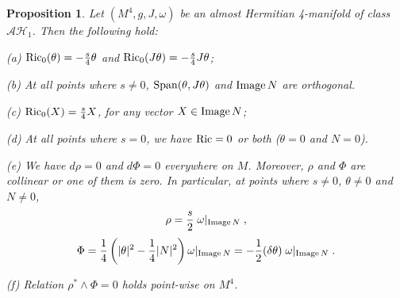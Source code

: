 \documentclass{amsart}
\newtheorem{prop}[theorem]{Proposition}
\begin{document}
\begin{prop} \label{ah1-facts}
Let $(M^4, g, J, \omega)$ be an almost Hermitian 4-manifold of class $\mathcal{AH}_1$. Then the following hold:

\vspace{0.2cm}
(a) ${\rm Ric}_0(\theta) = -\frac{s}{4} \theta$ and ${\rm Ric}_0(J\theta) = -\frac{s}{4} J\theta$;

\vspace{0.2cm}
(b) At all points where $s \neq 0$, ${\rm Span}(\theta, J\theta)$ and ${\rm Image} \, N $ are orthogonal. 

\vspace{0.2cm}

(c) ${\rm Ric}_0(X) = \frac{s}{4} X$, for any vector $ X \in {\rm Image} \, N$;

\vspace{0.2cm}

(d) At all points where $s = 0$, we have ${\rm Ric} = 0$ or both ($\theta = 0$ and $N=0$).

\vspace{0.2cm}

(e) We have $d \rho = 0$ and $d \Phi = 0$ everywhere on $M$. Moreover,  $\rho$ and $\Phi$ are collinear or one of them is zero. In particular, at points where $s\neq 0$, $\theta \neq 0$ and $N\neq 0$, 
$$\rho = \frac{s}{2} \; \omega|_{{\rm Image}\, N}  \; ,$$
$$ \Phi = \frac{1}{4} \left( |\theta|^2 - \frac{1}{4}|N|^2 \right) \omega|_{{\rm Image}\, N} = -\frac{1}{2} (\delta \theta)\; \omega|_{{\rm Image}\, N}\; .$$

\vspace{0.2cm}

(f) Relation $\rho^* \wedge \Phi = 0$ holds point-wise on $M^4$.
\end{prop}

\end{document}
